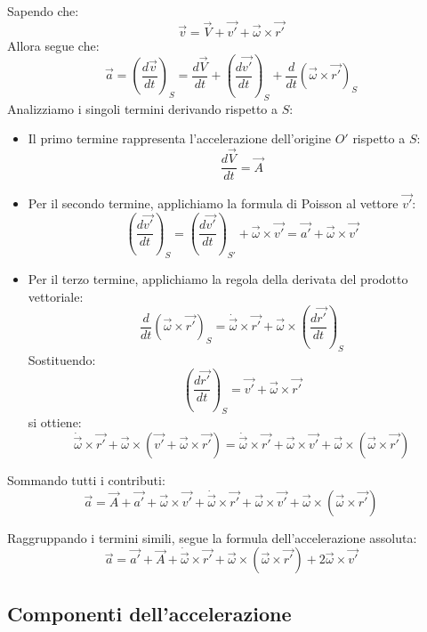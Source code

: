 \documentclass[11pt, a4paper, openright]{book}
\theoremstyle{plain}
\theoremstyle{definition}
\begin{document}
Sapendo che:
\[\vec{v} = \vec{V} + \vec{v'} + \vec{\omega} \times \vec{r'}\]
Allora segue che:
\[\vec{a} = \left(\frac{d\vec{v}}{dt}\right)_S = \frac{d\vec{V}}{dt} + \left(\frac{d\vec{v'}}{dt}\right)_S + \frac{d}{dt}(\vec{\omega} \times \vec{r'})_S\]
Analizziamo i singoli termini derivando rispetto a $S$:
\begin{itemize}
    \item Il primo termine rappresenta l'accelerazione dell'origine $O'$ rispetto a $S$:
        \[\frac{d\vec{V}}{dt} = \vec{A}\]
    \item Per il secondo termine, applichiamo la formula di Poisson al vettore $\vec{v'}$:
        \[\left(\frac{d\vec{v'}}{dt}\right)_S = \left(\frac{d\vec{v'}}{dt}\right)_{S'} + \vec{\omega} \times \vec{v'} = \vec{a'} + \vec{\omega} \times \vec{v'}\]
    \item Per il terzo termine, applichiamo la regola della derivata del prodotto vettoriale:
        \[\frac{d}{dt}(\vec{\omega} \times \vec{r'})_S = \dot{\vec{\omega}} \times \vec{r'} + \vec{\omega} \times \left(\frac{d\vec{r'}}{dt}\right)_S\]
        Sostituendo:
        \[\left(\frac{d\vec{r'}}{dt}\right)_S = \vec{v'} + \vec{\omega} \times \vec{r'}\]
        si ottiene:
        \[\dot{\vec{\omega}} \times \vec{r'} + \vec{\omega} \times (\vec{v'} + \vec{\omega} \times \vec{r'}) = \dot{\vec{\omega}} \times \vec{r'} + \vec{\omega} \times \vec{v'} + \vec{\omega} \times (\vec{\omega} \times \vec{r'})\]
\end{itemize}
Sommando tutti i contributi:
\[\vec{a} = \vec{A} + \vec{a'} + \vec{\omega} \times \vec{v'} + \dot{\vec{\omega}} \times \vec{r'} + \vec{\omega} \times \vec{v'} + \vec{\omega} \times (\vec{\omega} \times \vec{r'})\]

Raggruppando i termini simili, segue la formula dell'accelerazione assoluta:
\[\vec{a} = \vec{a'} + \vec{A} + \dot{\vec{\omega}} \times \vec{r'} + \vec{\omega} \times (\vec{\omega} \times \vec{r'}) + 2\vec{\omega} \times \vec{v'}\]

\subsection{Componenti dell'accelerazione}
\end{document}
